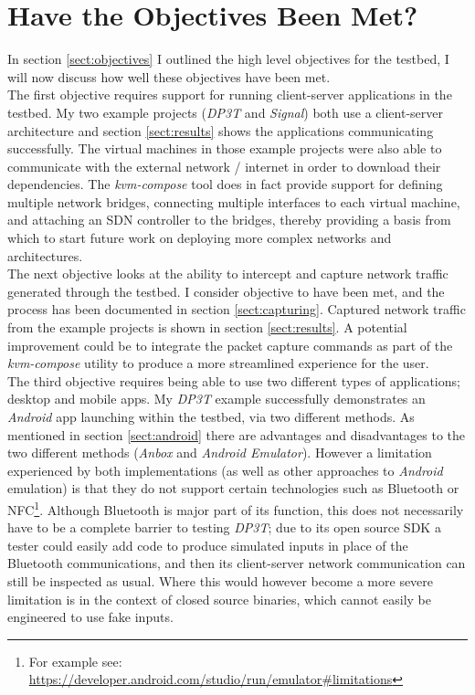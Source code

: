 \documentclass[
    author={Jacob Daniel Halsey},
    supervisor={Prof. Awais Rashid},
    degree={BSc},
    title={Building a Testbed for Evaluating Privacy Enhancing Technologies  (PETs)},
    subtitle={},
    type={software development},
    year={2021}
]{dissertation}
\begin{document}
\section{Have the Objectives Been Met?}

In section \ref{sect:objectives} I outlined the high level objectives for the testbed, I will now discuss
how well these objectives have been met. \\

The first objective requires support for running client-server applications in the testbed.
My two example projects (\emph{DP3T} and \emph{Signal}) both use a client-server architecture
and section \ref{sect:results} shows the applications communicating successfully.
The virtual machines in those example projects were also able to communicate with the external network
/ internet in order to download their dependencies.
The \emph{kvm-compose} tool does in fact provide support for defining multiple network bridges,
connecting multiple interfaces to each virtual machine, and attaching an SDN controller to the bridges, 
thereby providing a basis from which to start future work on deploying more
complex networks and architectures. \\

The next objective looks at the ability to intercept and capture network traffic
generated through the testbed. I consider objective to have been met, and the process
has been documented in section \ref{sect:capturing}. Captured network traffic from
the example projects is shown in section \ref{sect:results}. A potential improvement
could be to integrate the packet capture commands as part of the \emph{kvm-compose} utility
to produce a more streamlined experience for the user. \\

The third objective requires being able to use two different types of applications; desktop and
mobile apps. My \emph{DP3T} example successfully demonstrates an \emph{Android} app launching within the testbed,
via two different methods. As mentioned in section \ref{sect:android} there are advantages and
disadvantages to the two different methods (\emph{Anbox} and \emph{Android Emulator}). However
a limitation experienced by both implementations (as well as other approaches to \emph{Android} emulation)
is that they do not support certain technologies such as Bluetooth or NFC\footnote{For example see: 
\url{https://developer.android.com/studio/run/emulator\#limitations}}.
Although Bluetooth is major part of its function, this does not necessarily have to be a complete barrier
to testing \emph{DP3T}; due to its open source SDK a tester could easily add code to produce simulated
inputs in place of the Bluetooth communications, and then its client-server network communication can still
be inspected as usual. Where this would however become a more severe limitation is in the context
of closed source binaries, which cannot easily be engineered to use fake inputs. \\
\end{document}
